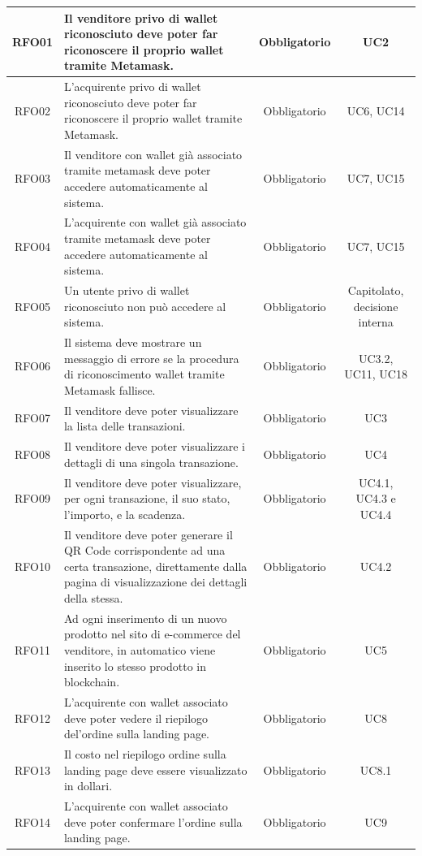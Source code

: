 \documentclass[a4paper, 12pt]{article}
\begin{document}
\begin{longtable}{|c|p{5cm}|c|c|}
\hline
RFO01 & Il venditore privo di wallet riconosciuto deve poter far riconoscere il proprio wallet tramite Metamask. & Obbligatorio & UC2 \\
\hline
RFO02 & L'acquirente privo di wallet riconosciuto deve poter far riconoscere il proprio wallet tramite Metamask. & Obbligatorio & UC6, UC14 \\
\hline
RFO03 & Il venditore con wallet già associato tramite metamask deve poter accedere automaticamente al sistema. & Obbligatorio & UC7, UC15 \\
\hline
RFO04 & L'acquirente con wallet già associato tramite metamask deve poter accedere automaticamente al sistema. & Obbligatorio & UC7, UC15 \\
\hline
RFO05 & Un utente privo di wallet riconosciuto non può accedere al sistema. & Obbligatorio & Capitolato, decisione interna \\
\hline
RFO06 & Il sistema deve mostrare un messaggio di errore se la procedura di riconoscimento wallet tramite Metamask fallisce. & Obbligatorio & UC3.2, UC11, UC18 \\
\hline
RFO07 & Il venditore deve poter visualizzare la lista delle transazioni. & Obbligatorio & UC3 \\ 
\hline
RFO08 & Il venditore deve poter visualizzare i dettagli di una singola transazione. & Obbligatorio & UC4 \\ 
\hline
RFO09 & Il venditore deve poter visualizzare, per ogni transazione, il suo stato, l'importo, e la scadenza. & Obbligatorio & UC4.1, UC4.3 e UC4.4 \\ 
\hline
RFO10 & Il venditore deve poter generare il QR Code corrispondente ad una certa transazione, direttamente dalla pagina di visualizzazione dei dettagli della stessa. & Obbligatorio & UC4.2 \\ 
\hline
RFO11 & Ad ogni inserimento di un nuovo prodotto nel sito di e-commerce del venditore, in automatico viene inserito lo stesso prodotto in blockchain. & Obbligatorio & UC5 \\ 
\hline
RFO12 & L'acquirente con wallet associato deve poter vedere il riepilogo del'ordine sulla landing page. & Obbligatorio & UC8 \\
\hline
RFO13 & Il costo nel riepilogo ordine sulla landing page deve essere visualizzato in dollari. & Obbligatorio & UC8.1 \\
\hline
RFO14 & L'acquirente con wallet associato deve poter confermare l'ordine sulla landing page. & Obbligatorio & UC9 \\
\hline

\end{longtable}
\end{document}
